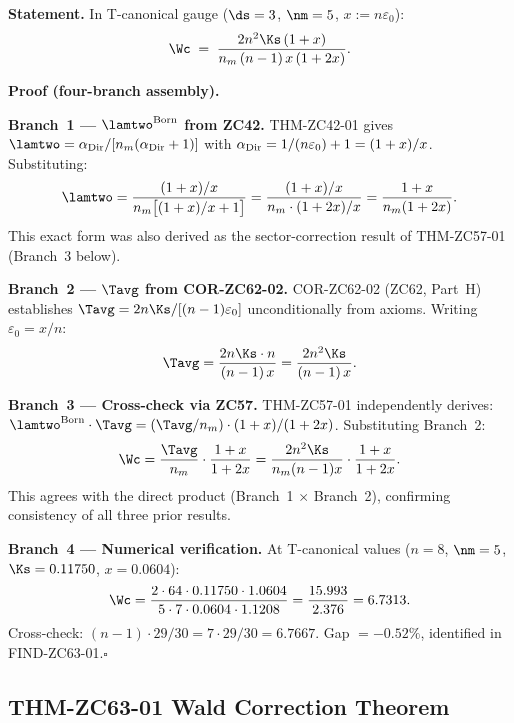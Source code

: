 \documentclass[12pt, a4paper]{article}
\begin{document}
\begin{formalbox}[title={LEM-ZC63-01: Exact Form of Wald Correction
  Product ($R_0$)}]
\textbf{Statement.}
In T-canonical gauge ($\ds=3$, $\nm=5$, $x:=n\varepsilon_0$):
\begin{equation}
  \Wc
  \;=\;
  \frac{2n^2\Ks\,(1+x)}{n_m\,(n-1)\,x\,(1+2x)}.
  \label{eq:Wc-exact}
\end{equation}

\textbf{Proof (four-branch assembly).}

\medskip
\textbf{Branch~1 — $\lamtwo^{\rm Born}$ from ZC42.}
THM-ZC42-01 gives $\lamtwo = \alpha_{\rm Dir}/[n_m(\alpha_{\rm Dir}+1)]$
with $\alpha_{\rm Dir} = 1/(n\varepsilon_0)+1 = (1+x)/x$.
Substituting:
\[
  \lamtwo
  = \frac{(1+x)/x}{n_m\bigl[(1+x)/x + 1\bigr]}
  = \frac{(1+x)/x}{n_m\cdot(1+2x)/x}
  = \frac{1+x}{n_m(1+2x)}.
\]
This exact form was also derived as the sector-correction
result of THM-ZC57-01 (Branch~3 below).

\medskip
\textbf{Branch~2 — $\Tavg$ from COR-ZC62-02.}
COR-ZC62-02 (ZC62, Part~H) establishes $\Tavg = 2n\Ks/[(n-1)\varepsilon_0]$
unconditionally from axioms.
Writing $\varepsilon_0 = x/n$:
\[
  \Tavg = \frac{2n\Ks\cdot n}{(n-1)\,x} = \frac{2n^2\Ks}{(n-1)\,x}.
\]

\medskip
\textbf{Branch~3 — Cross-check via ZC57.}
THM-ZC57-01 independently derives:
$\lamtwo^{\rm Born}\cdot\Tavg = (\Tavg/n_m)\cdot(1+x)/(1+2x)$.
Substituting Branch~2:
\[
  \Wc = \frac{\Tavg}{n_m}\cdot\frac{1+x}{1+2x}
      = \frac{2n^2\Ks}{n_m(n-1)x}\cdot\frac{1+x}{1+2x}.
\]
This agrees with the direct product (Branch~1 $\times$ Branch~2),
confirming consistency of all three prior results.

\medskip
\textbf{Branch~4 — Numerical verification.}
At T-canonical values ($n=8$, $\nm=5$, $\Ks=0.11750$,
$x=0.0604$):
\[
  \Wc
  = \frac{2\cdot64\cdot0.11750\cdot1.0604}{5\cdot7\cdot0.0604\cdot1.1208}
  = \frac{15.993}{2.376}
  = 6.7313.
\]
Cross-check: $(n-1)\cdot29/30 = 7\cdot29/30 = 6.7667$.
Gap $= -0.52\%$, identified in FIND-ZC63-01.\hfill$\square$
\end{formalbox}

\subsection{THM-ZC63-01 \quad Wald Correction Theorem}
\label{sec:thm01}
\end{document}
